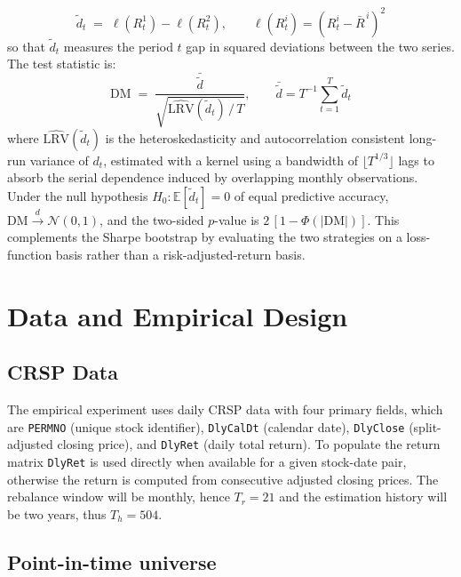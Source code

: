 \documentclass[12pt]{article}
\begin{document}
\begin{equation}
    \tilde{d}_t \;=\; \ell\!\left(R_t^{1}\right) - \ell\!\left(R_t^{2}\right), \qquad \ell(R_t^{i}) = \left(R_t^{i} - \bar{R}^{\,i}\right)^{2}
    \label{eq: dm_stat_start}
\end{equation}
so that $\tilde{d}_t$ measures the period $t$ gap in squared deviations between the two series. The test statistic is:
\begin{equation}
\mathrm{DM} \;=\; \frac{\bar{\tilde{d}}}{\sqrt{\widehat{\mathrm{LRV}}(\tilde{d}_t)\,/\,T}}, 
\qquad 
\bar{\tilde{d}} = T^{-1}\sum_{t=1}^{T} \tilde{d}_t
\label{eq: dm_stat}
\end{equation}
where $\widehat{\mathrm{LRV}}(\tilde{d}_t)$ is the heteroskedasticity and autocorrelation consistent long-run variance of $d_t$, estimated with a \cite{neweywest1994} kernel using a bandwidth of $\lfloor T^{1/3} \rfloor$ lags to absorb the serial dependence induced by overlapping monthly observations. Under the null hypothesis $H_0:\mathbb{E}[\tilde{d}_t] = 0$ of equal predictive accuracy, $\mathrm{DM} \xrightarrow{d} \mathcal{N}(0,1)$, and the two-sided $p$-value is $2\,[1-\Phi(|\mathrm{DM}|)]$. This complements the Sharpe bootstrap by evaluating the two strategies on a loss-function basis rather than a risk-adjusted-return basis.

\section{Data and Empirical Design}
\label{sec:data}
\subsection{CRSP Data}
The empirical experiment uses daily CRSP data with four primary fields, which are \texttt{PERMNO} (unique stock identifier), \texttt{DlyCalDt} (calendar date), \texttt{DlyClose} (split-adjusted closing price), and \texttt{DlyRet} (daily total return). To populate the return matrix \texttt{DlyRet} is used directly when available for a given stock-date pair, otherwise the return is computed from consecutive adjusted closing prices. The rebalance window will be monthly, hence $T_r=21$ and the estimation history will be two years, thus $T_h=504$.

\subsection{Point-in-time universe}
\label{sec:data-pit}
\end{document}
